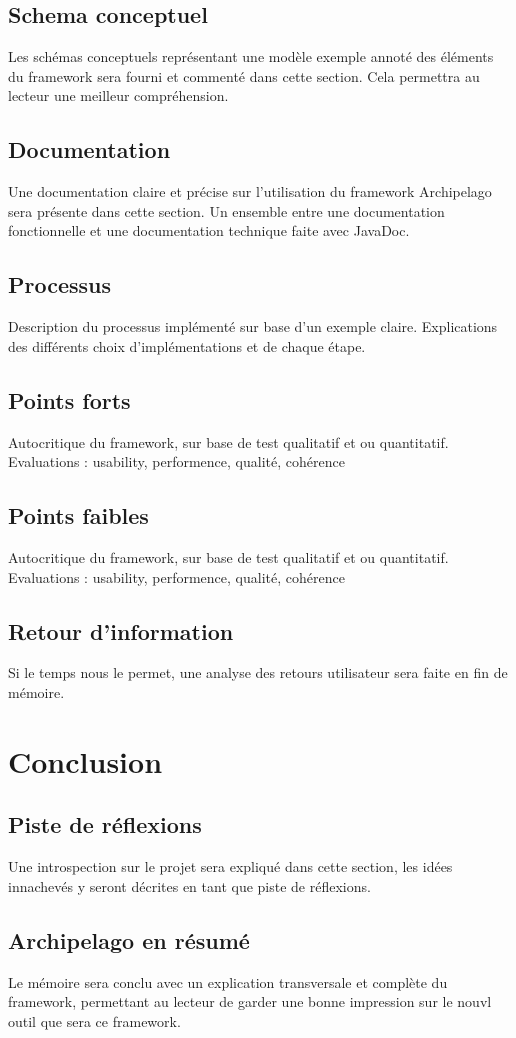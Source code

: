 \documentclass[a4paper,12pt,twoside, fleqn]{report}
\begin{document}
\section{Schema conceptuel}
Les schémas conceptuels représentant une modèle exemple annoté des éléments du framework sera fourni et commenté dans cette section. Cela permettra au lecteur une meilleur compréhension.
\section{Documentation}
Une documentation claire et précise sur l'utilisation du framework Archipelago sera présente dans cette section. Un ensemble entre une documentation fonctionnelle et une documentation technique faite avec JavaDoc.
\section{Processus}
Description du processus implémenté sur base d'un exemple claire. Explications des différents choix d'implémentations et de chaque étape.
\section{Points forts}
Autocritique du framework, sur base de test qualitatif et ou quantitatif. Evaluations : usability, performence, qualité, cohérence
\section{Points faibles}
Autocritique du framework, sur base de test qualitatif et ou quantitatif.
Evaluations : usability, performence, qualité, cohérence
\section{Retour d'information}
Si le temps nous le permet, une analyse des retours utilisateur sera faite en fin de mémoire.
\chapter{Conclusion}
\section{Piste de réflexions}
Une introspection sur le projet sera expliqué dans cette section, les idées innachevés y seront décrites en tant que piste de réflexions.
\section{Archipelago en résumé}
Le mémoire sera conclu avec un explication transversale et complète du framework, permettant au lecteur de garder une bonne impression sur le nouvl outil que sera ce framework.
\end{document}

